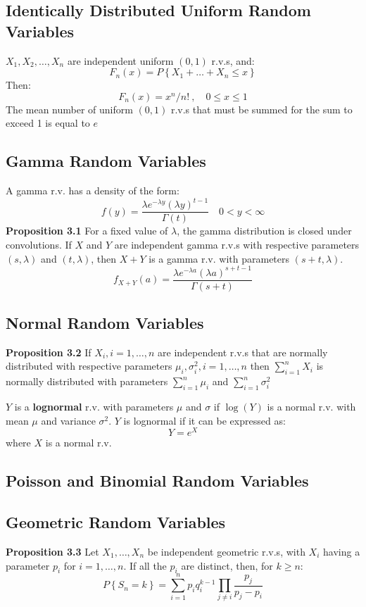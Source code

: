 \documentclass[openany]{book}
\numberwithin{equation}{section}
\begin{document}
\begin{flushleft}
\subsection{Identically Distributed Uniform Random Variables}
$X_1,X_2,\dots,X_n$ are independent uniform $(0,1)$ r.v.s, and:
\[F_n(x)=P\left\{X_1+\dots +X_n \leq x \right\}
\]
Then:
\[F_n(x)=x^n/{n!} \ , \quad 0 \leq x \leq 1
\]
The mean number of uniform $(0,1)$ r.v.s that must be summed for the sum to exceed 1 is equal to $e$
\subsection{Gamma Random Variables}
A gamma r.v. has a density of the form:
\[f(y)=\frac{\lambda e^{-\lambda y}(\lambda y)^{t-1}}{\Gamma(t)} \quad 0<y<\infty
\]
\textbf{Proposition 3.1}
For a fixed value of $\lambda$, the gamma distribution is closed under convolutions. \medbreak
If $X$ and $Y$ are independent gamma r.v.s with respective parameters $(s,\lambda)$ and $(t,\lambda)$, then $X+Y$ is a gamma r.v. with parameters $(s+t,\lambda)$.
\[f_{X+Y}(a)=\frac{\lambda e^{-\lambda a}(\lambda a)^{s+t-1}}{\Gamma(s+t)}
\]
\subsection{Normal Random Variables}
\textbf{Proposition 3.2} If $X_i,i=1,\dots,n$ are independent r.v.s that are normally distributed with respective parameters $\mu_i,\sigma^2_i,i=1,\dots,n$ then $\sum \limits_{i=1}^{n}X_i$ is normally distributed with parameters $\sum \limits_{i=1}^{n}\mu_i$ and $\sum \limits_{i=1}^{n}\sigma^2_i$ \medbreak

$Y$ is a \textbf{lognormal} r.v. with parameters $\mu$ and $\sigma$ if $\log(Y)$ is a normal r.v. with mean $\mu$ and variance $\sigma^2$. $Y$ is lognormal if it can be expressed as:
\[Y=e^X\]
where $X$ is a normal r.v.
\subsection{Poisson and Binomial Random Variables}
\subsection{Geometric Random Variables}
\textbf{Proposition 3.3} Let $X_1,\dots,X_n$ be independent geometric r.v.s, with $X_i$ having a parameter $p_i$ for $i=1,\dots,n$. If all the $p_i$ are distinct, then, for $k\geq n$:
\[P\left\{S_n=k \right\}=\sum_{i=1}^{n}p_iq_i^{k-1}\prod_{j \neq i}\frac{p_j}{p_j-p_i}
\]

\end{flushleft}
\end{document}
